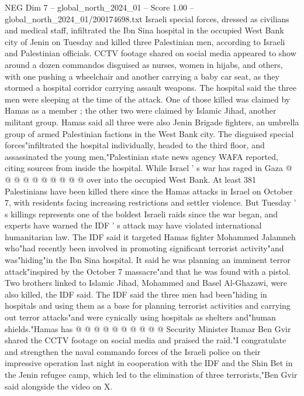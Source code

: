 \begin{textsample}{NEG Dim 7 – global\_north\_2024\_01 – Score 1.00 – global\_north\_2024\_01/200174698.txt}  \label{ex:f7_neg_269}
Israeli special forces, dressed as civilians and medical staff, infiltrated the Ibn Sina hospital in the occupied West Bank city of Jenin on Tuesday and killed three Palestinian men, according to Israeli and Palestinian officials.
CCTV footage shared on social media appeared to show around a dozen commandos disguised as nurses, women in hijabs, and others, with one pushing a wheelchair and another carrying a baby car seat, as they stormed a hospital corridor carrying assault weapons.
The hospital said the three men were sleeping at the time of the attack.
One of those killed was claimed by Hamas as a member ; the other two were claimed by Islamic Jihad, another militant group.
Hamas said all three were also Jenin Brigade fighters, an umbrella group of armed Palestinian factions in the West Bank city.
The disguised special forces"infiltrated the hospital individually, headed to the third floor, and assassinated the young men,"Palestinian state news agency WAFA reported, citing sources from inside the hospital.
While Israel ' s war has raged in Gaza @ @ @ @ @ @ @ @ @ @ over into the occupied West Bank.
At least 381 Palestinians have been killed there since the Hamas attacks in Israel on October 7, with residents facing increasing restrictions and settler violence.
But Tuesday ' s killings represents one of the boldest Israeli raids since the war began, and experts have warned the IDF ' s attack may have violated international humanitarian law.
The IDF said it targeted Hamas fighter Mohammed Jalamneh who"had recently been involved in promoting significant terrorist activity"and was"hiding"in the Ibn Sina hospital.
It said he was planning an imminent terror attack"inspired by the October 7 massacre"and that he was found with a pistol.
Two brothers linked to Islamic Jihad, Mohammed and Basel Al-Ghazawi, were also killed, the IDF said.
The IDF said the three men had been"hiding in hospitals and using them as a base for planning terrorist activities and carrying out terror attacks"and were cynically using hospitals as shelters and"human shields."Hamas has @ @ @ @ @ @ @ @ @ @ Security Minister Itamar Ben Gvir shared the CCTV footage on social media and praised the raid."I congratulate and strengthen the naval commando forces of the Israeli police on their impressive operation last night in cooperation with the IDF and the Shin Bet in the Jenin refugee camp, which led to the elimination of three terrorists,"Ben Gvir said alongside the video on X.

\end{textsample}

